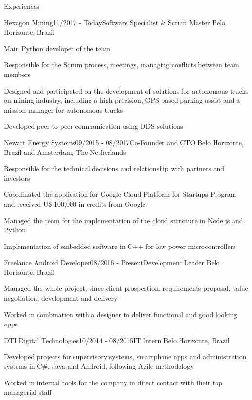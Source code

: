 \documentclass[14pt, a4paper]{resume} %
\begin{document}
\begin{rSection}{Experiences}


\begin{rSubsection}{Hexagon Mining}{11/2017 - Today}{\normalfont Software Specialist \& Scrum Master}{ \normalfont Belo Horizonte, Brazil}
 	\item Main Python developer of the team
 	\item Responsible for the Scrum process, meetings, managing conflicts between team members
 	\item Designed and participated on the development of solutions for autonomous trucks on mining industry, including a high precision, GPS-based parking assist and a mission manager for autonomous trucks
 	\item Developed peer-to-peer communication using DDS solutions

 	
	
\end{rSubsection}

\begin{rSubsection}{Newatt Energy Systems}{09/2015 - 08/2017}{\normalfont Co-Founder and CTO}{ \normalfont Belo Horizonte, Brazil and Amsterdam, The Netherlands}
 	\item Responsible for the technical decisions and relationship with partners and investors
 	\item Coordinated the application for Google Cloud Platform for Startups Program and received U\$ 100,000 in credits from Google
 	\item Managed the team for the implementation of the cloud structure in Node.js and Python
 	\item Implementation of embedded software in C++ for low power microcontrollers
	
\end{rSubsection}


\begin{rSubsection}{Freelance Android Developer}{08/2016 - Present}{\normalfont Development Leader}{ \normalfont Belo Horizonte, Brazil}
 	\item Managed the whole project, since client prospection, requirements proposal, value negotiation, development and delivery
 	\item Worked in combination with a designer to deliver functional and good looking apps
\end{rSubsection}

\begin{rSubsection}{DTI Digital Technologies}{10/2014 - 08/2015}{\normalfont IT Intern}{ \normalfont Belo Horizonte, Brazil}
 	\item Developed projects for supervisory systems, smartphone apps and administration systems in C$\#$, Java and Android, following Agile methodology
 	\item Worked in internal tools for the company in direct contact with their top managerial staff
\end{rSubsection}


\end{rSection}
\end{document}
